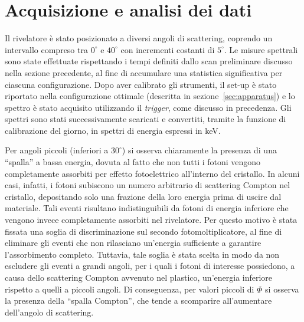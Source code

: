 \documentclass[10pt,twocolumn]{article}
\begin{document}
\section{Acquisizione e analisi dei dati}
\label{sec:analisi}

Il rivelatore è stato posizionato a diversi angoli di scattering, coprendo un intervallo compreso tra $0^\circ$ e $40^\circ$ con incrementi costanti di $5^\circ$. Le misure spettrali sono state effettuate rispettando i tempi definiti dallo scan preliminare discusso nella sezione precedente, al fine di accumulare una statistica significativa per ciascuna configurazione. Dopo aver calibrato gli strumenti, il set-up è stato riportato nella configurazione ottimale (descritta in sezione~\ref{sec:apparatus}) e lo spettro è stato acquisito utilizzando il \textit{trigger}, come discusso in precedenza. Gli spettri sono stati successivamente scaricati e convertiti, tramite la funzione di calibrazione del giorno, in spettri di energia espressi in keV. 

Per angoli piccoli (inferiori a $30^\circ$) si osserva chiaramente la presenza di una ``spalla'' a bassa energia, dovuta al fatto che non tutti i fotoni vengono completamente assorbiti per effetto fotoelettrico all'interno del cristallo. In alcuni casi, infatti, i fotoni subiscono un numero arbitrario di scattering Compton nel cristallo, depositando solo una frazione della loro energia prima di uscire dal materiale. Tali eventi risultano indistinguibili da fotoni di energia inferiore che vengono invece completamente assorbiti nel rivelatore. Per questo motivo è stata fissata una soglia di discriminazione sul secondo fotomoltiplicatore, al fine di eliminare gli eventi che non rilasciano un'energia sufficiente a garantire l'assorbimento completo. Tuttavia, tale soglia è stata scelta in modo da non escludere gli eventi a grandi angoli, per i quali i fotoni di interesse possiedono, a causa dello scattering Compton avvenuto nel plastico, un'energia inferiore rispetto a quelli a piccoli angoli. Di conseguenza, per valori piccoli di $\Phi$ si osserva la presenza della ``spalla Compton'', che tende a scomparire all'aumentare dell'angolo di scattering.
\end{document}
